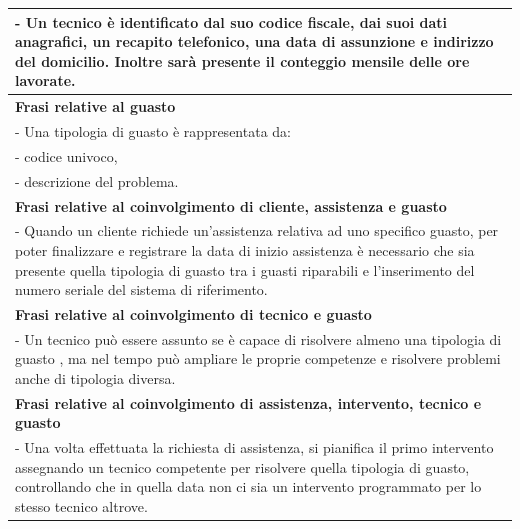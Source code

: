 \documentclass[legalpaper]{article}
\begin{document}
\begin{tabular}{ |p{16 cm}| }
\hline
- Un tecnico è identificato dal suo codice fiscale, dai suoi dati anagrafici, un recapito telefonico, una data di assunzione e indirizzo del domicilio.\newline
Inoltre sarà presente il conteggio mensile delle ore lavorate.
\\
\hline
\textbf{Frasi relative al guasto}  \\
\hline
- Una tipologia di guasto è rappresentata da: \\
- codice univoco, \\
- descrizione del problema.\\
\hline
\textbf{Frasi relative al coinvolgimento di cliente, assistenza e guasto}  \\
\hline
- Quando un cliente richiede un'assistenza relativa ad uno specifico guasto, per poter finalizzare e registrare la data di inizio assistenza è necessario che sia presente quella tipologia di guasto tra i guasti riparabili e l'inserimento del numero seriale del sistema di riferimento.\\
\hline
\textbf{Frasi relative al coinvolgimento di tecnico e guasto}  \\
\hline
- Un tecnico può essere assunto se è capace di risolvere almeno una tipologia di guasto , ma nel tempo può ampliare le proprie competenze e risolvere problemi anche di tipologia diversa.\\
\hline


\textbf{Frasi relative al coinvolgimento di assistenza, intervento, tecnico e guasto}  \\
\hline
- Una volta effettuata la richiesta di assistenza, si pianifica il primo intervento assegnando un tecnico competente per risolvere quella tipologia di guasto, controllando che in quella data non ci sia un intervento programmato per lo stesso tecnico altrove.\\
\hline
\end{tabular}
\end{document}
